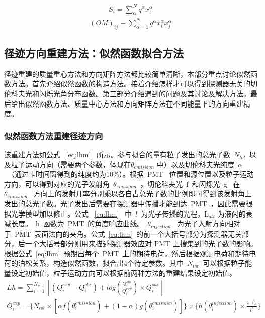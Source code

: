\begin{equation}\label{eq:cmm}
\begin{split}
S_i = \sum^N_{\alpha} q^{\alpha}x^{\alpha}_i
\end{split}
\end{equation}
\begin{eqnarray}\label{eq:omm}
(OM)_{ij}\equiv \sum_{\alpha=1}^{N} q^{\alpha}x^{\alpha}_i x^{\alpha}_j
\end{eqnarray}

\subsection{径迹方向重建方法：似然函数拟合方法}
径迹重建的质量重心方法和方向矩阵方法都比较简单清晰，本部分重点讨论似然函数方法。首先介绍似然函数的构造方法。接着介绍怎样才可以得到探测器无关的切伦科夫光和闪烁光角分布函数。第三部分介绍遇到的问题及其讨论及解决方法。最后给出似然函数方法、质量中心方法和方向矩阵方法在不同能量下的方向重建精度。
\subsubsection{似然函数方法重建径迹方向}
该重建方法如公式 ~\ref{eq:lhm}~ 所示。参与拟合的量有粒子发出的总光子数~$N_{tot}$~以及粒子运动方向（需要两个参数，体现在$\theta_{emission}$ 中）以及切伦科夫光纯度~$\alpha$~（通过卡时间窗得到的纯度约为10\%）。根据~PMT~ 位置和源位置以及粒子运动方向，可以得到对应的光子发射角~$\theta_{emission}$~。切伦科夫光~f~和闪烁光~g~ 在~$\theta_{emission}$~ 方向上的发射几率分别乘以各自占总光子数的比例即可得到该发射角上发出的总光子数。光子发出后需要在探测器中传播才能到达~PMT~，因此需要根据光学模型加以修正。公式 ~\ref{eq:lhm}~ 中~$l$~为光子传播的光程，L$_{att}$ 为液闪的衰减长度。~h~函数为~PMT~的角度响应曲线。~$\theta_{injection}$~ 为光子入射方向相对于~PMT~表面法向的夹角。公式~\ref{eq:lhm}~的前一个大括号部分为探测器无关部分，后一个大括号部分则用来描述探测器效应对 PMT 上搜集到的光子数的影响。 根据公式~\ref{eq:lhm}~预期出每个~PMT~上的期待电荷，然后根据观测电荷和期待电荷的泊松关系，构造似然函数，拟合出4个待定参数。其中~$N_{tot}$~可以根据粒子能量设定初始值，粒子运动方向可以根据前两种方法的重建结果设定初始值。
\begin{eqnarray}\label{eq:lhm}
Lh = \sum_{i=1}^{N_{pmt}} \left [  ( Q^{exp}_i -Q^{obs}_i )+log(\frac{Q^{obs}_i}{Q^{exp}_i}) \times Q^{obs}_i \right ] \quad\quad\quad\quad\quad\quad \\
Q^{exp}_i  =
 \bigg \{ N_{tot} \times \left [ \alpha f(\theta^{emission}_i)+(1-\alpha)g(\theta^{emission}_i) \right ] \bigg \}
\times \bigg \{ h(\theta_i^{injection}) \times \frac{e^{-\frac{l_i}{L_{att}}}}{l^2_i} \bigg \} \nonumber
\end{eqnarray}
